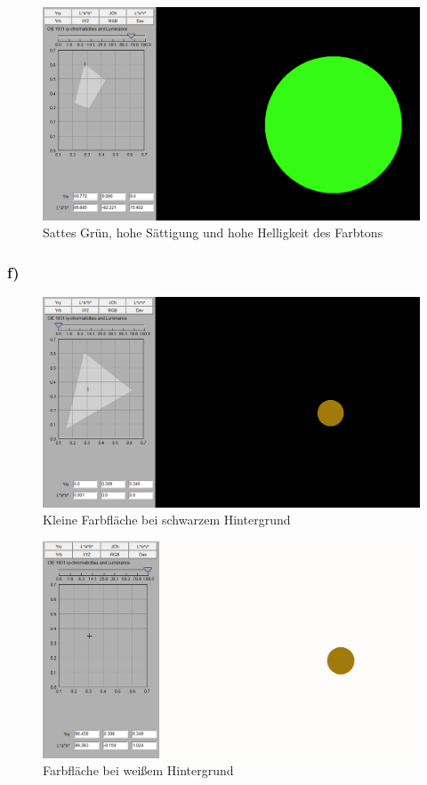 \documentclass[a4paper]{article}
\begin{document}
\begin{figure}[H]
    \centering
    \includegraphics[width=0.7\columnwidth]{images/A4_cde_SattesGruen.PNG}
    \caption{Sattes Grün, hohe Sättigung und hohe Helligkeit des Farbtons}
    \label{fig:A4cde6}
\end{figure}

\subsubsection*{f)}

\begin{figure}[H]
    \centering
    \includegraphics[width=0.9\columnwidth]{images/A4_f_DunklerHintergrundSmall.PNG}
    \caption{Kleine Farbfläche bei schwarzem Hintergrund}
    \label{fig:A4f}
\end{figure}

\begin{figure}[H]
    \centering
    \includegraphics[width=0.9\columnwidth]{images/A4_f_HellerHintergrundSmall.PNG}
    \caption{Farbfläche bei weißem Hintergrund}
    \label{fig:A4f2}
\end{figure}
\end{document}
